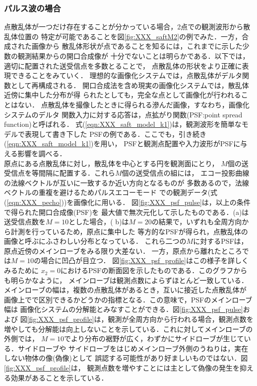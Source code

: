 \subsubsection{パルス波の場合}
点散乱体が一つだけ存在することが分かっている場合，2点での観測波形から散乱体位置の
特定が可能であることを図\ref{fig:XXX_saftM2}の例でみた．一方，合成された画像から
散乱体形状が点であることを知るには，これまでに示した少数の観測結果からの開口合成像が
十分でないことは明らかである．以下では，適切に配置された送受信点を多数とることで，
点散乱体の形状をより正確に表現できることをみていく．
理想的な画像化システムでは，点散乱体がデルタ関数として再構成される．
開口合成法を含め現実の画像化システムでは，散乱体近傍に集中した分布が得
られたとしても，完全な点として画像化が行われることはない．
点散乱体を撮像したときに得られる滲んだ画像，すなわち，画像化システムのデルタ
関数入力に対する応答は，点拡がり関数(PSF:point spread function)と呼ばれる．
式(\ref{eqn:XXX_saft_model_k1})は，観測波形を簡単なモデルで表現して書き下した
PSFの例である．ここでも，引き続き(\ref{eqn:XXX_saft_model_k1})を用い，
PSFと観測点配置や入力波形がPSFに与える影響を調べる．\\

原点にある点散乱体に対し，散乱体を中心とする円を観測面にとり，
$M$個の送受信点を等間隔に配置する．これら$M$個の送受信点の組には，
エコー投影曲線の法線ベクトルが互いに一致するか近い方向となるものが
多数あるので，法線ベクトルの重複を避けるためパルスエコーモード
での観測データ(式(\ref{eqn:XXX_pecho}))を画像化に用いる．
図\ref{fig:XXX_psf_pulse}は，以上の条件で得られた開口合成像(PSF)を
最大値で無次元化して示したものである．(a)は送受信点数を$M=10$とした場合，(
b)は$M=20$の結果で，いずれも全周方向から計測を行っているため，原点に集中した
等方的なPSFが得られ，点散乱体の画像と呼ぶにふさわしい分布となっている．
これら二つの$M$に対するPSFは，原点近傍のメインローブをみる限り大差ない．
一方，原点から離れたところでは$M=10$の場合に凹凸が目立つ．
図\ref{fig:XXX_psf_profile}はこの様子を詳しくみるために 
$x_2=0$におけるPSFの断面図を示したものである．このグラフからも明らかなように，
メインローブは観測点数によらずほとんど一致している．
メインローブの幅は，複数の点散乱体があるとき，互いに接近した点散乱体が
画像上でで区別できるかどうかの指標となる．この意味で，PSFのメインローブ幅は
画像化システムの分解能とみなすことができる．図\ref{fig:XXX_psf_pulse}および
図\ref{fig:XXX_psf_profile}は，観測が全周方向から行われる場合，観測点数を
増やしても分解能は向上しないことを示している．これに対してメインローブの外側では，
$M=10$でより分布の裾野が広く，わずかにサイドローブが生じている．サイドローブや
サイドローブをはじめメインローブ外側のうねりは，実在しない物体の像(偽像)として
誤認する可能性があり好ましいものではない．図\ref{fig:XXX_psf_profile}は，
観測点数を増やすことには主として偽像の発生を抑える効果があることを示している．\\

